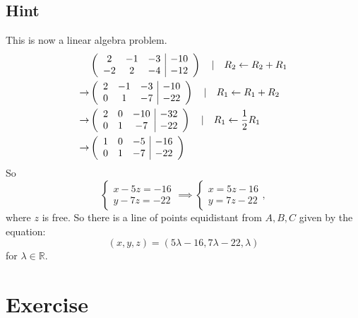 \documentclass[a4paper,10pt]{article}
\begin{document}
\subsection{Hint}
This is now a linear algebra problem.
\begin{align*}
     & \left(
    \begin{array}{c c c|c}
            2  & -1 & -3 & -10 \\
            -2 & 2  & -4 & -12 \\
        \end{array}
    \right) \quad | \quad R_2 \leftarrow R_2 + R_1       \\ \rightarrow
     & \left(
    \begin{array}{c c c|c}
            2 & -1 & -3 & -10 \\
            0 & 1  & -7 & -22 \\
        \end{array}
    \right) \quad | \quad R_1 \leftarrow R_1 + R_2       \\ \rightarrow
     & \left(
    \begin{array}{c c c|c}
            2 & 0 & -10 & -32 \\
            0 & 1 & -7  & -22 \\
        \end{array}
    \right) \quad | \quad R_1 \leftarrow \frac{1}{2} R_1 \\ \rightarrow
     & \left(
    \begin{array}{c c c|c}
            1 & 0 & -5 & -16 \\
            0 & 1 & -7 & -22 \\
        \end{array}
    \right)
\end{align*}
So
\[
    \begin{cases}
        x - 5z = -16 \\
        y - 7z = -22
    \end{cases} \implies \begin{cases}
        x = 5z - 16 \\
        y = 7z - 22
    \end{cases},
\]
where $z$ is free. So there is a line of points equidistant from $A, B, C$ given by the equation:
\[
    (x, y, z) = (5\lambda - 16, 7\lambda - 22, \lambda)
\]
for $\lambda\in\mathbb{R}$.

\clearpage

\section{Exercise}
\end{document}
